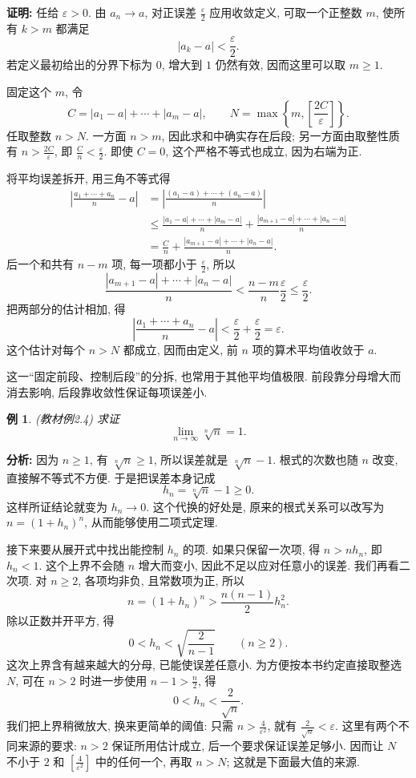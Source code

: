 \documentclass[UTF8,openany]{ctexbook}
\theoremstyle{chinesetextbook}
\newtheorem{example}{例}[section]
\newenvironment{cnproof}{\par\indent\textbf{证明:} \ignorespaces}{\par}
\begin{document}
\begin{cnproof}
任给 $\varepsilon>0$. 由 $a_n\to a$, 对正误差 $\displaystyle\frac\varepsilon2$ 应用收敛定义, 可取一个正整数 $m$, 使所有 $k>m$ 都满足
\[
|a_k-a|<\frac\varepsilon2.
\]
若定义最初给出的分界下标为 $0$, 增大到 $1$ 仍然有效, 因而这里可以取 $m\ge1$.

固定这个 $m$, 令
\[
C=|a_1-a|+\cdots+|a_m-a|,\qquad
N=\max\left\{m,\left[\frac{2C}{\varepsilon}\right]\right\}.
\]
任取整数 $n>N$. 一方面 $n>m$, 因此求和中确实存在后段; 另一方面由取整性质有 $\displaystyle n>\frac{2C}{\varepsilon}$, 即 $\displaystyle\frac Cn<\frac\varepsilon2$. 即使 $C=0$, 这个严格不等式也成立, 因为右端为正.

将平均误差拆开, 用三角不等式得
\[
\begin{aligned}
\left|\frac{a_1+\cdots+a_n}{n}-a\right|
&=\left|\frac{(a_1-a)+\cdots+(a_n-a)}n\right|\\
&\le\frac{|a_1-a|+\cdots+|a_m-a|}{n}
 +\frac{|a_{m+1}-a|+\cdots+|a_n-a|}{n}\\
&=\frac Cn+\frac{|a_{m+1}-a|+\cdots+|a_n-a|}{n}.
\end{aligned}
\]
后一个和共有 $n-m$ 项, 每一项都小于 $\displaystyle\frac\varepsilon2$, 所以
\[
\frac{|a_{m+1}-a|+\cdots+|a_n-a|}{n}
<\frac{n-m}{n}\frac\varepsilon2
\le\frac\varepsilon2.
\]
把两部分的估计相加, 得
\[
\left|\frac{a_1+\cdots+a_n}{n}-a\right|
<\frac\varepsilon2+\frac\varepsilon2=\varepsilon.
\]
这个估计对每个 $n>N$ 都成立, 因而由定义, 前 $n$ 项的算术平均值收敛于 $a$.
\end{cnproof}

这一“固定前段、控制后段”的分拆, 也常用于其他平均值极限. 前段靠分母增大而消去影响, 后段靠收敛性保证每项误差小.

\begin{example}
\textnormal{(教材例2.4)} 求证
\[
\lim_{n\to\infty}\sqrt[n]{n}=1.
\]
\end{example}

\par\indent\textbf{分析:} 因为 $n\ge1$, 有 $\sqrt[n]{n}\ge1$, 所以误差就是 $\sqrt[n]{n}-1$. 根式的次数也随 $n$ 改变, 直接解不等式不方便. 于是把误差本身记成
\[
h_n=\sqrt[n]{n}-1\ge0.
\]
这样所证结论就变为 $h_n\to0$. 这个代换的好处是, 原来的根式关系可以改写为 $n=(1+h_n)^n$, 从而能够使用二项式定理.

接下来要从展开式中找出能控制 $h_n$ 的项. 如果只保留一次项, 得 $n>nh_n$, 即 $h_n<1$. 这个上界不会随 $n$ 增大而变小, 因此不足以应对任意小的误差. 我们再看二次项. 对 $n\ge2$, 各项均非负, 且常数项为正, 所以
\[
n=(1+h_n)^n>\frac{n(n-1)}2h_n^2.
\]
除以正数并开平方, 得
\[
0<h_n<\sqrt{\frac2{n-1}}\qquad(n\ge2).
\]
这次上界含有越来越大的分母, 已能使误差任意小. 为方便按本书约定直接取整选 $N$, 可在 $n>2$ 时进一步使用 $\displaystyle n-1>\frac n2$, 得
\[
0<h_n<\frac2{\sqrt n}.
\]
我们把上界稍微放大, 换来更简单的阈值: 只需 $\displaystyle n>\frac4{\varepsilon^2}$, 就有 $\displaystyle\frac2{\sqrt n}<\varepsilon$. 这里有两个不同来源的要求: $n>2$ 保证所用估计成立, 后一个要求保证误差足够小. 因而让 $N$ 不小于 $2$ 和 $\displaystyle[\frac4{\varepsilon^2}]$ 中的任何一个, 再取 $n>N$; 这就是下面最大值的来源.
\end{document}
